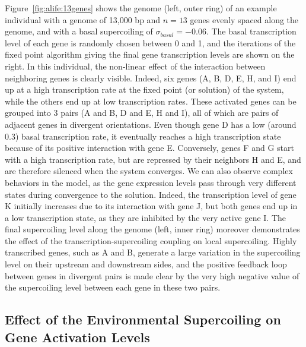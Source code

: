 Figure~\ref{fig:alife:13genes} shows the genome (left, outer ring) of an example individual with a genome of 13,000 bp and $n=13$ genes evenly spaced along the genome, and with a basal supercoiling of $\sigma_{basal} = -0.06$.
The basal transcription level of each gene is randomly chosen between 0 and 1, and the iterations of the fixed point algorithm giving the final gene transcription levels are shown on the right.
In this individual, the non-linear effect of the interaction between neighboring genes is clearly visible.
Indeed, six genes (A, B, D, E, H, and I) end up at a high transcription rate at the fixed point (or solution) of the system, while the others end up at low transcription rates.
These activated genes can be grouped into 3 pairs (A and B, D and E, H and I), all of which are pairs of adjacent genes in divergent orientations.
Even though gene D has a low (around 0.3) basal transcription rate, it eventually reaches a high transcription state because of its positive interaction with gene E.
Conversely, genes F and G start with a high transcription rate, but are repressed by their neighbors H and E, and are therefore silenced when the system converges.
We can also observe complex behaviors in the model, as the gene expression levels pass through very different states during convergence to the solution.
Indeed, the transcription level of gene K initially increases due to its interaction with gene J, but both genes end up in a low transcription state, as they are inhibited by the very active gene I.
The final supercoiling level along the genome (left, inner ring) moreover demonstrates the effect of the transcription-supercoiling coupling on local supercoiling.
Highly transcribed genes, such as A and B, generate a large variation in the supercoiling level on their upstream and downstream sides, and the positive feedback loop between genes in divergent pairs is made clear by the very high negative value of the supercoiling level between each gene in these two pairs.


\subsection{Effect of the Environmental Supercoiling on Gene Activation Levels}
\label{sec:alife:env_model}

